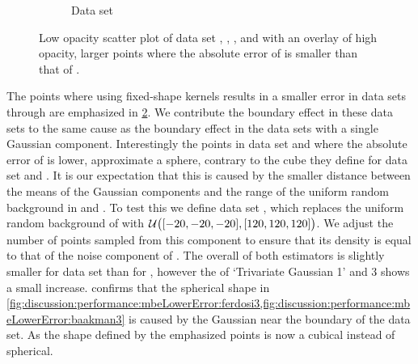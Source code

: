 \begin{figure}
\begin{subfigure}{0.23\textwidth}
				\caption{Data set \baakmanThree}
				\label{fig:discussion:performance:mbeLowerError:baakman3}
			\end{subfigure}			
			\caption{Low opacity scatter plot of data set %
				 \ferdosiTwo, %
				 \baakmanTwo, %
				 \ferdosiThree, and %
				 \baakmanThree %
				with an overlay of high opacity, larger points where the absolute error of \mbe is smaller than that of \sambe.}
			\label{fig:discussion:performance:multisphere:mbeLowerError}
		\end{figure}	
		The points where using fixed-shape kernels results in a smaller error in data sets \ferdosiTwo through \baakmanThree are emphasized in
		\cref{fig:discussion:performance:multisphere:mbeLowerError}. We contribute the boundary effect in these data sets to the same cause as the boundary effect in the data sets with a single Gaussian component. Interestingly the points in data set \ferdosiThree and \baakmanThree where the absolute error of \mbe is lower, approximate a sphere, contrary to the cube they define for data set \ferdosiTwo and \baakmanTwo. It is our expectation that this is caused by the smaller distance between the means of the Gaussian components and the range of the uniform random background in \ferdosiThree and \baakmanThree.
			To test this we define data set \ferdosiThreeNoise, which replaces the uniform random background of \ferdosiThree with $\mathcal{U}\big([-20, -20, -20], [120, 120, 120]\big)$. We adjust the number of points sampled from this component to ensure that its density is equal to that of the noise component of \ferdosiThree.
			The overall \mse of both estimators is slightly smaller for data set \ferdosiThreeNoise than for \ferdosiThree, however the \mse of `Trivariate Gaussian 1' and 3 shows a small increase. 
			 confirms that the spherical shape in \cref{fig:discussion:performance:mbeLowerError:ferdosi3,fig:discussion:performance:mbeLowerError:baakman3} is caused by the Gaussian near the boundary of the data set. As the shape defined by the emphasized points is now a cubical instead of spherical. 

